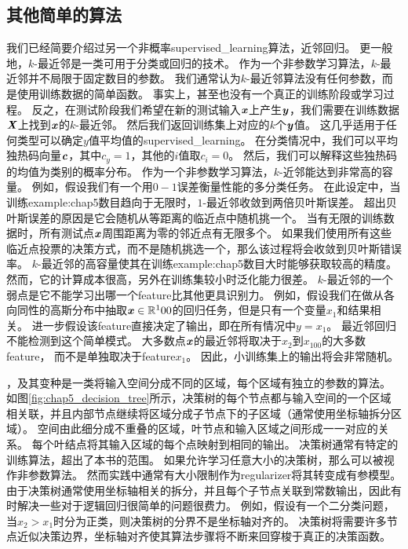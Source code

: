 \subsection{其他简单的算法}
\label{sec:other_simple_supervised_learning_algorithms}
我们已经简要介绍过另一个非概率\gls{supervised_learning}算法，近邻回归。
更一般地，$k$-最近邻是一类可用于分类或回归的技术。
作为一个非参数学习算法，$k$-最近邻并不局限于固定数目的参数。
我们通常认为$k$-最近邻算法没有任何参数，而是使用训练数据的简单函数。
事实上，甚至也没有一个真正的训练阶段或学习过程。
反之，在测试阶段我们希望在新的测试输入$\boldsymbol{\mathit{x}}$上产生$\boldsymbol{\mathit{y}}$，我们需要在训练数据$\boldsymbol{\mathit{X}}$上找到$\boldsymbol{\mathit{x}}$的$k$-最近邻。
然后我们返回训练集上对应的$k$个$\boldsymbol{\mathit{y}}$值。
这几乎适用于任何类型可以确定$y$值平均值的\gls{supervised_learning}。
在分类情况中，我们可以平均独热码向量$\boldsymbol{\mathit{c}}$，其中$c_y = 1$，其他的$i$值取$c_i=0$。
然后，我们可以解释这些独热码的均值为类别的概率分布。
作为一个非参数学习算法，$k$-近邻能达到非常高的容量。
例如，假设我们有一个用$0-1$误差衡量性能的多分类任务。
在此设定中，当训练\gls{example:chap5}数目趋向于无限时，$1$-最近邻收敛到两倍贝叶斯误差。
超出贝叶斯误差的原因是它会随机从等距离的临近点中随机挑一个。
当有无限的训练数据时，所有测试点$\boldsymbol{\mathit{x}}$周围距离为零的邻近点有无限多个。
如果我们使用所有这些临近点投票的决策方式，而不是随机挑选一个，那么该过程将会收敛到贝叶斯错误率。
$k$-最近邻的高容量使其在训练\gls{example:chap5}数目大时能够获取较高的精度。
然而，它的计算成本很高，另外在训练集较小时泛化能力很差。
$k$-最近邻的一个弱点是它不能学习出哪一个\gls{feature}比其他更具识别力。
例如，假设我们在做从各向同性的高斯分布中抽取$\boldsymbol{\mathit{x}}\in\mathbb{R}^100$的回归任务，但是只有一个变量$x_1$和结果相关。
进一步假设该\gls{feature}直接决定了输出，即在所有情况中$y=x_1$。
最近邻回归不能检测到这个简单模式。
大多数点$\boldsymbol{\mathit{x}}$的最近邻将取决于$x_2$到$x_100$的大多数\gls{feature}，
而不是单独取决于\gls{feature}$x_1$。
因此，小训练集上的输出将会非常随机。


，及其变种是一类将输入空间分成不同的区域，每个区域有独立的参数的算法\citep{Breiman84}。
如图\ref{fig:chap5_decision_tree}所示，决策树的每个节点都与输入空间的一个区域相关联，并且内部节点继续将区域分成子节点下的子区域（通常使用坐标轴拆分区域）。
空间由此细分成不重叠的区域，叶节点和输入区域之间形成一一对应的关系。
每个叶结点将其输入区域的每个点映射到相同的输出。
决策树通常有特定的训练算法，超出了本书的范围。
如果允许学习任意大小的决策树，那么可以被视作非参数算法。
然而实践中通常有大小限制作为\gls{regularizer}将其转变成有参模型。
由于决策树通常使用坐标轴相关的拆分，并且每个子节点关联到常数输出，因此有时解决一些对于逻辑回归很简单的问题很费力。
例如，假设有一个二分类问题，当$x_2>x_1$时分为正类，则决策树的分界不是坐标轴对齐的。
决策树将需要许多节点近似决策边界，坐标轴对齐使其算法步骤将不断来回穿梭于真正的决策函数。

